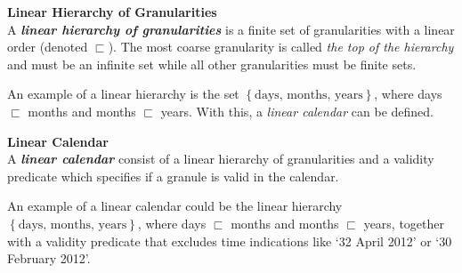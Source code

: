 

\begin{svgraybox}
\vspace{-10pt}
\begin{definition}\textbf{Linear Hierarchy of Granularities}\\
A \emph{\textbf{linear hierarchy of granularities}} is a finite set of granularities with a linear order (denoted $\sqsubset$). The most coarse granularity is called \emph{the top of the hierarchy} and must be an infinite set while all other granularities must be finite sets.
\end{definition}
\vspace{-10pt}
\end{svgraybox}

An example of a linear hierarchy is the set $\left\{ \text{days, months, years} \right\}$, where days $\sqsubset$ months and months $\sqsubset$ years. With this, a \emph{linear calendar} can be defined.

\begin{svgraybox}
\vspace{-10pt}
\begin{definition}\textbf{Linear Calendar}\\
A \emph{\textbf{linear calendar}} consist of a linear hierarchy of granularities and a validity predicate which specifies if a granule is valid in the calendar.
\end{definition}
\vspace{-10pt}
\end{svgraybox}

An example of a linear calendar could be the linear hierarchy $\left\{ \text{days, months, years} \right\}$, where days $\sqsubset$ months and months $\sqsubset$ years, together with a validity predicate that excludes time indications like `32 April 2012' or `30 February 2012'.

 
